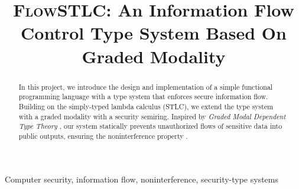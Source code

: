 \documentclass[conference]{IEEEtran}
\begin{document}
\title{\textsc{FlowSTLC}: An Information Flow Control Type System Based On Graded Modality
}

\author{
\and
{}
\and
{}
}

\maketitle

\begin{abstract}
In this project, we introduce the design and implementation of a simple functional programming language with a type system that enforces secure information flow. Building on the simply-typed lambda calculus (STLC), we extend the type system with a graded modality with a security semiring. Inspired by \textit{Graded Modal Dependent Type Theory} \cite{moon2021graded}, our system statically prevents unauthorized flows of sensitive data into public outputs, ensuring the noninterference property \cite{smith2007principles}.
\end{abstract}

\begin{IEEEkeywords}
Computer security, information flow, noninterference, security-type systems
\end{IEEEkeywords}
\end{document}

